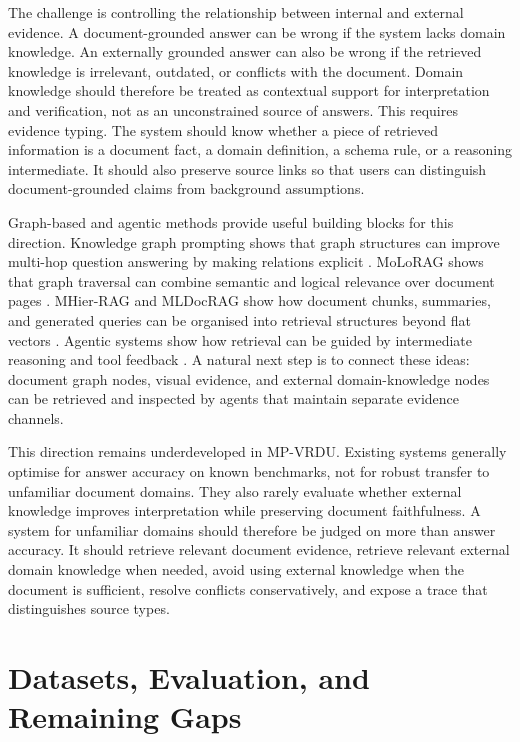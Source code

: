 \documentclass[10pt,a4paper]{article}
\begin{document}
The challenge is controlling the relationship between internal and external evidence. A document-grounded answer can be wrong if the system lacks domain knowledge. An externally grounded answer can also be wrong if the retrieved knowledge is irrelevant, outdated, or conflicts with the document. Domain knowledge should therefore be treated as contextual support for interpretation and verification, not as an unconstrained source of answers. This requires evidence typing. The system should know whether a piece of retrieved information is a document fact, a domain definition, a schema rule, or a reasoning intermediate. It should also preserve source links so that users can distinguish document-grounded claims from background assumptions.

Graph-based and agentic methods provide useful building blocks for this direction. Knowledge graph prompting shows that graph structures can improve multi-hop question answering by making relations explicit \cite{wang2024knowledge}. MoLoRAG shows that graph traversal can combine semantic and logical relevance over document pages \cite{wu2025molorag}. MHier-RAG and MLDocRAG show how document chunks, summaries, and generated queries can be organised into retrieval structures beyond flat vectors \cite{gong2025mhier,zhang2026mldocrag}. Agentic systems show how retrieval can be guided by intermediate reasoning and tool feedback \cite{wu2025doc,wang2025vidorag,zheng2026doc}. A natural next step is to connect these ideas: document graph nodes, visual evidence, and external domain-knowledge nodes can be retrieved and inspected by agents that maintain separate evidence channels.

This direction remains underdeveloped in MP-VRDU. Existing systems generally optimise for answer accuracy on known benchmarks, not for robust transfer to unfamiliar document domains. They also rarely evaluate whether external knowledge improves interpretation while preserving document faithfulness. A system for unfamiliar domains should therefore be judged on more than answer accuracy. It should retrieve relevant document evidence, retrieve relevant external domain knowledge when needed, avoid using external knowledge when the document is sufficient, resolve conflicts conservatively, and expose a trace that distinguishes source types.

\section{Datasets, Evaluation, and Remaining Gaps}
\end{document}
